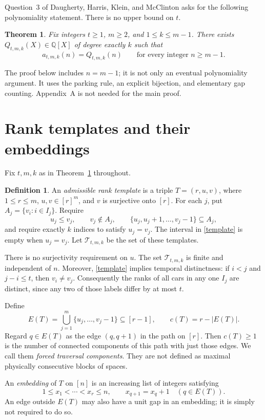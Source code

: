 \documentclass[11pt]{article}
\newtheorem{theorem}{Theorem}
\theoremstyle{definition}
\newtheorem{definition}{Definition}
\newcommand{\T}{\mathcal T}
\begin{document}
Question~3 of Daugherty, Harris, Klein, and McClinton \cite[p.~32]{metered} asks for the following polynomiality statement. There is no upper bound on $t$.
\begin{theorem}\label{main}
Fix integers $t\ge1$, $m\ge2$, and $1\le k\le m-1$. There exists $Q_{t,m,k}(X)\in\mathbb Q[X]$ of degree exactly $k$ such that
\[
 a_{t,m,k}(n)=Q_{t,m,k}(n)\qquad\text{for every integer }n\ge m-1.
\]
\end{theorem}
The proof below includes $n=m-1$; it is not only an eventual polynomiality argument. It uses the parking rule, an explicit bijection, and elementary gap counting. Appendix~A is not needed for the main proof.

\section{Rank templates and their embeddings}
Fix $t,m,k$ as in Theorem~\ref{main} throughout.
\begin{definition}
An \emph{admissible rank template} is a triple $T=(r,u,v)$, where $1\le r\le m$, $u,v\in[r]^m$, and $v$ is surjective onto $[r]$. For each $j$, put $A_j=\{v_i:i\in I_j\}$. Require
\begin{equation}\label{template}
 u_j\le v_j,\qquad v_j\notin A_j,\qquad
 \{u_j,u_j+1,\ldots,v_j-1\}\subseteq A_j,
\end{equation}
and require exactly $k$ indices to satisfy $u_j=v_j$. The interval in \eqref{template} is empty when $u_j=v_j$. Let $\T_{t,m,k}$ be the set of these templates.
\end{definition}
There is no surjectivity requirement on $u$. The set $\T_{t,m,k}$ is finite and independent of $n$. Moreover, \eqref{template} implies temporal distinctness: if $i<j$ and $j-i\le t$, then $v_i\ne v_j$. Consequently the ranks of all cars in any one $I_j$ are distinct, since any two of those labels differ by at most $t$.

Define
\begin{equation}\label{edges}
 E(T)=\bigcup_{j=1}^m\{u_j,\ldots,v_j-1\}\subseteq[r-1],
 \qquad c(T)=r-|E(T)|.
\end{equation}
Regard $q\in E(T)$ as the edge $(q,q+1)$ in the path on $[r]$. Then $c(T)\ge1$ is the number of connected components of this path with just those edges. We call them \emph{forced traversal components}. They are not defined as maximal physically consecutive blocks of spaces.

An \emph{embedding} of $T$ on $[n]$ is an increasing list of integers satisfying
\begin{equation}\label{embedding}
 1\le x_1<\cdots<x_r\le n,\qquad x_{q+1}=x_q+1\quad(q\in E(T)).
\end{equation}
An edge outside $E(T)$ may also have a unit gap in an embedding; it is simply not required to do so.
\end{document}
